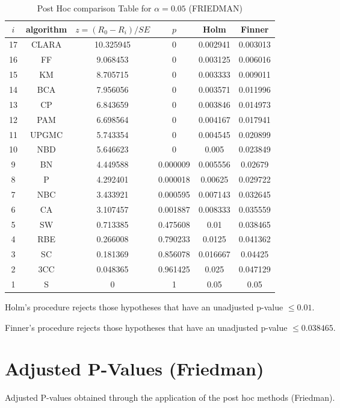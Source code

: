 \documentclass[a4paper,10pt]{article}
\begin{document}
\begin{landscape}
\begin{table}[!htp]
\centering\footnotesize
\begin{tabular}{cccccc}
$i$&algorithm&$z=(R_0 - R_i)/SE$&$p$&Holm &Finner\\
\hline17&CLARA&10.325945&0&0.002941&0.003013\\16&FF&9.068453&0&0.003125&0.006016\\15&KM&8.705715&0&0.003333&0.009011\\14&BCA&7.956056&0&0.003571&0.011996\\13&CP&6.843659&0&0.003846&0.014973\\12&PAM&6.698564&0&0.004167&0.017941\\11&UPGMC&5.743354&0&0.004545&0.020899\\10&NBD&5.646623&0&0.005&0.023849\\9&BN&4.449588&0.000009&0.005556&0.02679\\8&P&4.292401&0.000018&0.00625&0.029722\\7&NBC&3.433921&0.000595&0.007143&0.032645\\6&CA&3.107457&0.001887&0.008333&0.035559\\5&SW&0.713385&0.475608&0.01&0.038465\\4&RBE&0.266008&0.790233&0.0125&0.041362\\3&SC&0.181369&0.856078&0.016667&0.04425\\2&3CC&0.048365&0.961425&0.025&0.047129\\1&S&0&1&0.05&0.05\\\hline
\end{tabular}
\caption{Post Hoc comparison Table for $\alpha=0.05$ (FRIEDMAN)}
\end{table}Holm's procedure rejects those hypotheses that have an unadjusted p-value $\le0.01$.

Finner's procedure rejects those hypotheses that have an unadjusted p-value $\le0.038465$.


\newpage

\section{Adjusted P-Values (Friedman)}


Adjusted P-values obtained through the application of the post hoc methods (Friedman).


\end{landscape}
\end{document}
